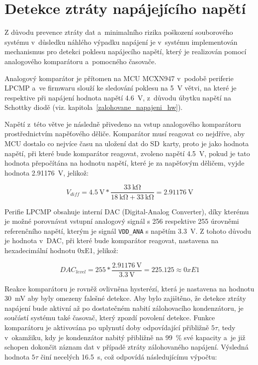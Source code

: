 \section{Detekce ztráty napájejícího napětí}
\label{detekce_ztraty_napajeciho_napeti}
Z důvodu prevence ztráty dat a~minimalního rizika poškození souborového systému v~důsledku náhlého výpadku napájení je v~systému implementován mechanismus pro detekci poklesu napájecího napětí, který je realizován pomocí analogového komparátoru a~pomocného časovače.  

Analogový komparátor je přítomen na MCU MCXN947 v~podobě periferie LPCMP a~ve firmwaru slouží ke sledování poklesu na \SI{5}{\volt} větvi, na které je respektive při napájení hodnota napětí \SI{4.6}{\volt}, z~důvodu úbytku napětí na Schottky diodě (viz. kapitola~\ref{zalohovane_napajeni_hw}).

\newpage


Napětí z~této větve je následně přivedeno na vstup analogového komparátoru prostřednictvím napěťového děliče. Komparátor musí reagovat co nejdříve, aby MCU dostalo co nejvíce času na uložení dat do SD~karty, proto je jako hodnota napětí, při které bude komparátor reagovat, zvoleno napětí \SI{4.5}{\volt}, pokud je tato hodnota přepočítána na hodnotu napětí, které je za napěťovým děličem, vyjde hodnota \SI{2.91176}{\volt}, jelikož:

\[
    V_{diff} = \SI{4.5}{\volt} * \frac{\SI{33}{\kilo\ohm}}{\SI{18}{\kilo\ohm} + \SI{33}{\kilo\ohm}} = \SI{2.91176}{\volt}
\]

Perifie LPCMP obsahuje interní DAC (Digital-Analog Converter), díky kterému je možné porovnávat vstupní analogový signál s 256 respektive 255 úrovněmi referenčního napětí, kterým je signál \texttt{VDD\_ANA} s napětím \SI{3.3}{\volt}. Z tohoto důvodu je hodnota v~DAC, při které bude komparátor reagovat, nastavena na hexadecimální hodnotu 0xE1, jelikož:

\[
    DAC_{level} = 255 * \frac{\SI{2.91176}{\volt}}{\SI{3.3}{\volt}} = 225.125 \approx  0xE1
\]

Reakce komparátoru je rovněž ovlivněna hysterézí, která je nastavena na hodnotu \SI{30}{\milli\volt} aby byly omezeny falešné detekce. Aby bylo zajištěno, že detekce ztráty napájení bude aktivní až po dostatečném nabití zálohovacího kondenzátoru, je součástí systému také časovač, který zpozdí povolení detekce. Funkce komparátoru je aktivována po uplynutí doby odpovídající přibližně $5\tau$, tedy v~okamžiku, kdy je kondenzátor nabitý přibližně na 99~\% své kapacity a~je již schopen dokončit záznam dat v případě ztráty zálohovaného napájení. Výsledná hodnota $5\tau$ činí necelých \SI{16.5}{\second}, což odpovídá následujícímu výpočtu:

